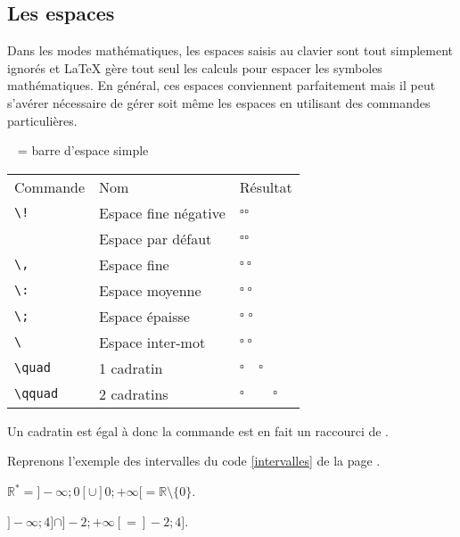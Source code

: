 \documentclass[10pt,french,openright,twoside]{book}
\begin{document}
\subsection{Les espaces}
Dans les modes mathématiques, les espaces saisis au clavier sont tout simplement ignorés et \LaTeX{} gère tout seul les calculs pour espacer les symboles mathématiques. En général, ces espaces conviennent parfaitement mais il peut s'avérer nécessaire de gérer soit même les espaces en utilisant des commandes particulières.

\begin{center}
\verb*! ! = barre d'espace simple\par\medskip

	\begin{tabular}{lll}

		\rowcolor{gray!50} Commande & Nom & Résultat  \\
        \verb+\!+ & Espace fine négative & $\square \! \square$\\
        \verb*! ! & Espace par défaut & $\square \square$\\
        \verb+\,+ & Espace fine & $\square \, \square$\\
        \verb+\:+ & Espace moyenne & $\square \: \square$\\
        \verb+\;+ & Espace épaisse & $\square \; \square$\\
        \verb*+\ + & Espace inter-mot & $\square \ \square$\\
        \verb+\quad+ & 1 cadratin & $\square \quad \square$\\
        \verb+\qquad+ & 2 cadratins & $\square \qquad \square$\\
	\end{tabular}
\end{center}

\begin{info}
    Un cadratin est égal à \ordi{1em} donc la commande  est en fait un raccourci de .
\end{info}

Reprenons l'exemple des intervalles du code \ref{intervalles} de la page \pageref{intervalles}.\bigskip

{\NewFont
\begin{SideBySideExample}
    $\mathds R^*=]-\infty ; 0[ \cup ]0 ; +\infty[ =
    \mathds R \setminus \{0\}$.\par\medskip
    $]-\infty ; 4] \cap ]-2 ; +\infty[ = ]-2 ; 4]$.
\end{SideBySideExample}
}\bigskip
\end{document}
